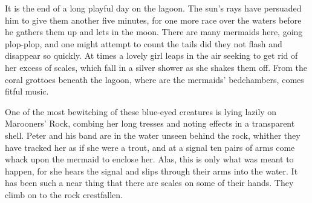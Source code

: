 

\begin{stagedir}
It is the end of a long playful day on the lagoon.
The sun’s rays have persuaded him to give them another five minutes,
for one more race over the waters before he gathers them up and lets in the moon.
There are many mermaids here, going plop-plop,
and one might attempt to count the tails did they not flash and disappear so quickly.
At times a lovely girl leaps in the air seeking to get rid of her excess of scales,
which fall in a silver shower as she shakes them off.
From the coral grottoes beneath the lagoon, where are the mermaids’ bedchambers, comes fitful music.

One of the most bewitching of these blue-eyed creatures is lying lazily on Marooners’ Rock,
combing her long tresses and noting effects in a transparent shell.
Peter and his band are in the water unseen behind the rock,
whither they have tracked her as if she were a trout,
and at a signal ten pairs of arms come whack upon the mermaid to enclose her.
Alas, this is only what was meant to happen, for she hears the signal
and slips through their arms into the water.
It has been such a near thing that there are scales on some of their hands.
They climb on to the rock crestfallen.
\end{stagedir}

